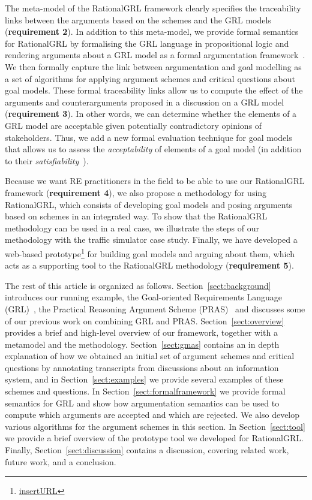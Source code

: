 The meta-model of the RationalGRL framework clearly specifies the traceability links between the arguments based on the schemes and the GRL models (\textbf{requirement 2}). In addition to this meta-model, we provide formal semantics for RationalGRL by formalising the GRL language in propositional logic and rendering arguments about a GRL model as a formal argumentation framework~\cite{Dung1995}. We then formally capture the link between argumentation and goal modelling as a set of algorithms for applying argument schemes and critical questions about goal models. These formal traceability links allow us to compute the effect of the arguments and counterarguments proposed in a discussion on a GRL model (\textbf{requirement 3}). In other words, we can determine whether the elements of a GRL model are acceptable given potentially contradictory opinions of stakeholders. Thus, we add a new formal evaluation technique for goal models that allows us to assess the \emph{acceptability} of elements of a goal model (in addition to their \emph{satisfiability}~\cite{Amyot:2010:EGM:1841349.1841356}).

Because we want RE practitioners in the field to be able to use our RationalGRL framework (\textbf{requirement 4}), we also propose a methodology for using RationalGRL, which consists of developing goal models and posing arguments based on schemes in an integrated way. To show that the RationalGRL methodology can be used in a real case, we illustrate the steps of our methodology with the traffic simulator case study. Finally, we have developed a web-based prototype\footnote{\url{insertURL}} for building goal models and arguing about them, which acts as a supporting tool to the RationalGRL methodology (\textbf{requirement 5}). 
 
The rest of this article is organized as follows. Section~\ref{sect:background} introduces our running example, the Goal-oriented Requirements Language (GRL)~\cite{Amyot:2010:EGM:1841349.1841356}, the Practical Reasoning Argument Scheme (PRAS)~\cite{atkinson2007} and discusses some of our previous work on combining GRL and PRAS. Section~\ref{sect:overview} provides a brief and high-level overview of our framework, together with a metamodel and the methodology. Section~\ref{sect:gmas} contains an in depth explanation of how we obtained an initial set of argument schemes and critical questions by annotating transcripts from discussions about an information system, and in Section~\ref{sect:examples} we provide several examples of these schemes and questions. In Section~\ref{sect:formalframework} we provide formal semantics for GRL and show how argumentation semantics \cite{Dung1995} can be used to compute which arguments are accepted and which are rejected. We also develop various algorithms for the argument schemes in this section. In Section~\ref{sect:tool} we provide a brief overview of the prototype tool we developed for RationalGRL. Finally, Section~\ref{sect:discussion} contains a discussion, covering related work, future work, and a conclusion.